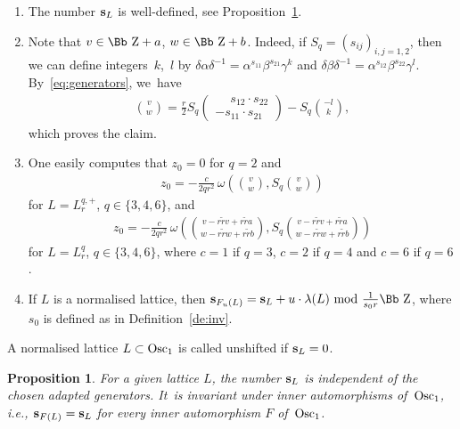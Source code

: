 \documentclass[10pt,a4paper]{amsart}
\newcommand\ZZ{{\mbox{\Bb Z}}}
\newcommand\bs{\textbf{{\rm \textbf{s}}}}
\newcommand{\Osc}{{\rm Osc}}
\newcommand{\benur}{\begin{enumerate}[label=$(\roman*)$]\itemsep=0pt}
\numberwithin{equation}{section}
\newtheorem{Proposition}[Theorem]{Proposition}
 { \theoremstyle{definition}
\newtheorem{Definition}[Theorem]{Definition}
\newtheorem{Note}[Theorem]{Note}
\newtheorem{Example}[Theorem]{Example}
\newtheorem{Remark}[Theorem]{Remark} }
\begin{document}
\begin{Remark}\label{rm4}\quad
\benur
\item The number $\bs_L$ is well-defined, see Proposition~\ref{scorrect}.
 \item %
 Note that $v\in\ZZ+a$, $w\in\ZZ+b$. Indeed, if $S_q=(s_{ij})_{i,j=1,2}$, then we can define inte\-gers~$k$,~$l$ by $\delta \alpha\delta^{-1}=\alpha^{s_{11}}\beta^{s_{21}}\gamma^k$ and $\delta \beta\delta^{-1}=\alpha^{s_{12}}\beta^{s_{22}}\gamma^l$. By~\eqref{eq:generators}, we~have
\begin{gather}\label{klvw}
 {v\choose w}=\frac r2 S_q \begin{pmatrix}\phantom{-}s_{12}\cdot s_{22}\\[0.5ex] -s_{11}\cdot s_{21}\end{pmatrix} -S_q{-l\choose k},
\end{gather}
which proves the claim.
\item%
One easily computes that $z_0=0$ for $q=2$ and
\begin{gather*}
z_0= -\frac{c}{2qr^2}\, \omega\left(\!{v \choose w},S_q{v \choose w}\!\right)
\end{gather*}
for $L=L^{q,+}_r$, $q\in\{3,4,6\}$, and
\begin{gather*}
z_0=-\frac{c}{2qr^2}\, \omega\left(\!{v-r\tilde rv+r\tilde ra\choose w-r\tilde rw+r\tilde rb},S_q{v-r\tilde rv+r\tilde ra\choose w-r\tilde rw+r\tilde rb}\!\right)
\end{gather*}
for $L=L^{q}_r$, $q\in\{3,4,6\}$, where $c=1$ if $q=3$, $c=2$ if $q=4$ and $c=6$ if $q=6$.
\item If $L$ is a normalised lattice, then $\bs_{F_u(L)}=\bs_L+u\cdot\lambda(L)\ {\rm mod}\ \frac1{s_0r}\ZZ$, where $s_0$ is defined as in Definition~\ref{de:inv}.
\end{enumerate}
\end{Remark}
%
\begin{Definition} A normalised lattice $L\subset\Osc_1$ is called unshifted if $\bs_L=0$.
\end{Definition}
%
\begin{Proposition}\label{scorrect}
For a given lattice $L$, the number $\bs_L$ is independent of the chosen adapted generators. It~is invariant under inner automorphisms of~$\Osc_1$, i.e., $\bs_{F(L)}=\bs_L$ for every inner automorphism $F$ of~$\Osc_1$.
\end{Proposition}
\end{document}
